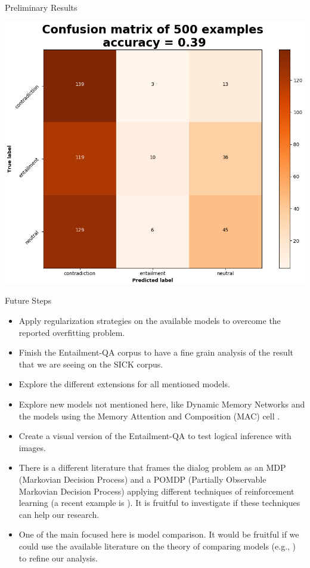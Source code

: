 \documentclass[10pt]{beamer}
\begin{document}
\begin{frame}{Preliminary Results}
\begin{center}
\includegraphics[scale=0.42]{images/cm_mem_EntailQA2.png}
\end{center}
\end{frame}


\begin{frame}{Future Steps}
\begin{itemize}
\item Apply regularization strategies on the available models to overcome the reported overfitting problem. 
\item Finish the Entailment-QA corpus to have a fine grain analysis of the result that we are seeing on the SICK corpus.
\item Explore the different extensions for all mentioned models.
\item Explore new models not mentioned here, like Dynamic Memory Networks \cite{KumarISBEPOGS15} and the models using the Memory Attention and Composition (MAC) cell \cite{Manning18}.
\item Create a visual version of the Entailment-QA to test logical inference with images.
\item There is a different literature that frames the dialog problem as an MDP (Markovian Decision Process) and a POMDP (Partially Observable Markovian Decision Process) applying different techniques of reinforcement learning (a recent example is \cite{Li:2016}). It is fruitful to investigate if these techniques can help our research.
\item One of the main focused here is model comparison. It would be fruitful if we could use the available literature  on the theory of comparing models (e.g., \cite{BenavoliCDZ17}) to refine our analysis.
\end{itemize}
\end{frame}
\end{document}
